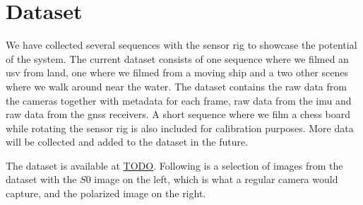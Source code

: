 \section{Dataset}
We have collected several sequences with the sensor rig to showcase the potential of the system.
The current dataset consists of one sequence where we filmed an \gls{usv} from land, one where we filmed from a moving ship and a two other scenes where we walk around near the water.
The dataset contains the raw data from the cameras together with metadata for each frame, raw data from the \gls{imu} and raw data from the \gls{gnss} receivers.
A short sequence where we film a chess board while rotating the sensor rig is also included for calibration purposes.
More data will be collected and added to the dataset in the future.

The dataset is available at \url{TODO}.
Following is a selection of images from the dataset with the $S0$ image on the left, which is what a regular camera would capture, and the polarized image on the right.

